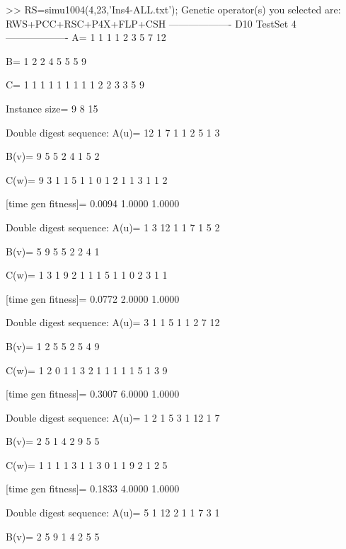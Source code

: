 >> RS=simu1004(4,23,'Ins4-ALL.txt');
Genetic operator(s) you selected are:
RWS+PCC+RSC+P4X+FLP+CSH
------------------- D10 TestSet 4 -------------------
A=
     1     1     1     1     2     3     5     7    12

B=
     1     2     2     4     5     5     5     9

C=
     1     1     1     1     1     1     1     1     1     2     2     3     3     5     9

Instance size=
     9     8    15

Double digest sequence:
A(u)=
    12     1     7     1     1     2     5     1     3

B(v)=
     9     5     5     2     4     1     5     2

C(w)=
     9     3     1     1     5     1     1     0     1     2     1     1     3     1     1     2

[time gen fitness]=
    0.0094    1.0000    1.0000

Double digest sequence:
A(u)=
     1     3    12     1     1     7     1     5     2

B(v)=
     5     9     5     5     2     2     4     1

C(w)=
     1     3     1     9     2     1     1     1     5     1     1     0     2     3     1     1

[time gen fitness]=
    0.0772    2.0000    1.0000

Double digest sequence:
A(u)=
     3     1     1     5     1     1     2     7    12

B(v)=
     1     2     5     5     2     5     4     9

C(w)=
     1     2     0     1     1     3     2     1     1     1     1     1     5     1     3     9

[time gen fitness]=
    0.3007    6.0000    1.0000

Double digest sequence:
A(u)=
     1     2     1     5     3     1    12     1     7

B(v)=
     2     5     1     4     2     9     5     5

C(w)=
     1     1     1     1     3     1     1     3     0     1     1     9     2     1     2     5

[time gen fitness]=
    0.1833    4.0000    1.0000

Double digest sequence:
A(u)=
     5     1    12     2     1     1     7     3     1

B(v)=
     2     5     9     1     4     2     5     5

